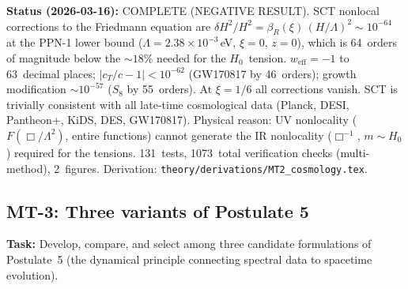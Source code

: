 \documentclass[12pt,a4paper]{article}
\newcommand{\Lam}{\Lambda}
\newcommand{\task}[1]{\noindent\textbf{Task:} #1\par}
\begin{document}
\textbf{Status (2026-03-16):} \textcolor{proven}{COMPLETE (NEGATIVE RESULT).}
SCT nonlocal corrections to the Friedmann equation are
$\delta H^2/H^2 = \beta_R(\xi)\,(H/\Lam)^2 \sim 10^{-64}$ at the PPN-1
lower bound ($\Lam = 2.38 \times 10^{-3}$\,eV, $\xi = 0$, $z = 0$), which
is 64~orders of magnitude below the ${\sim}18\%$ needed for the $H_0$~tension.
$w_{\text{eff}} = -1$ to 63~decimal places; $|c_T/c - 1| < 10^{-62}$
(GW170817 by 46~orders); growth modification $\sim 10^{-57}$ ($S_8$ by
55~orders). At $\xi = 1/6$ all corrections vanish. SCT is trivially
consistent with all late-time cosmological data (Planck, DESI, Pantheon+,
KiDS, DES, GW170817). Physical reason: UV nonlocality
($F(\Box/\Lam^2)$, entire functions) cannot generate the IR nonlocality
($\Box^{-1}$, $m \sim H_0$) required for the tensions.
131~tests, 1073~total verification checks (multi-method), 2~figures.
Derivation: \texttt{theory/derivations/MT2\_cosmology.tex}.

\subsection{MT-3: Three variants of Postulate 5}
\label{task:MT3}

\task{Develop, compare, and select among three candidate formulations of
Postulate~5 (the dynamical principle connecting spectral data to spacetime evolution).}
\end{document}
